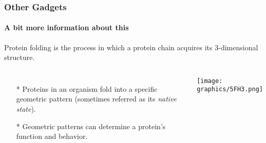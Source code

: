 \documentclass{beamer}
\begin{document}
  \begin{frame}
    \frametitle{Other Gadgets}
    \framesubtitle{A bit more information about this}
      Protein folding is the process in which a protein chain acquires its 3-dimensional structure.
    \begin{columns}[c] %
     \begin{itemize}
     	\item[*] Proteins in an organism fold into a specific geometric pattern (sometimes referred as its \textit{native state}).
     	\item[*]  Geometric patterns can determine a protein's function and behavior. 
     \end{itemize}
	     \begin{minipage}{\linewidth}
			\begin{center}
			\texttt{[image: graphics/5FH3.png]}
			\end{center}
		\end{minipage}
    \end{columns}
  \end{frame}
\end{document}
